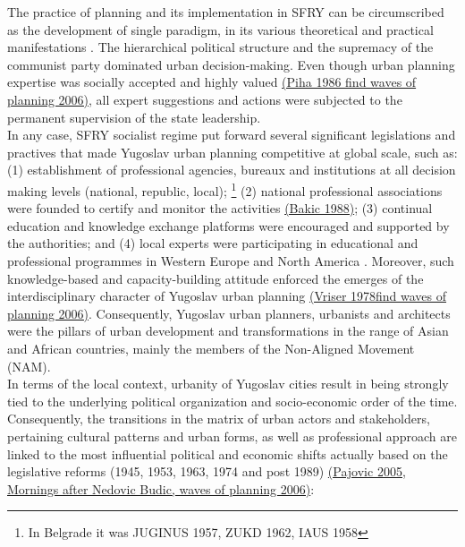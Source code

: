 \documentclass[11pt]{report}
\begin{document}
The practice of planning and its implementation in SFRY can be circumscribed as the development of single paradigm, in its various theoretical and practical manifestations \href{ref}{\citealt{vukmirovic_city_2013}}.
The hierarchical political structure and the supremacy of the communist party dominated urban decision-making.
Even though urban planning expertise was socially accepted and highly valued \href{ref}{(Piha 1986 find waves of planning 2006)}, all expert suggestions and actions were subjected to the permanent supervision of the state leadership.
\\
In any case, SFRY socialist regime put forward several significant legislations and practives that made Yugoslav urban planning competitive at global scale, such as: 
(1) establishment of professional agencies, bureaux and institutions at all decision making levels (national, republic, local);
\footnote{In Belgrade it was JUGINUS 1957, ZUKD 1962, IAUS 1958} (2) national professional associations were founded to certify and monitor the activities \href{ref}{(Bakic 1988)}; (3) continual education and knowledge exchange platforms were encouraged and supported by the authorities; and (4) local experts were participating in educational and professional programmes in Western Europe and North America \href{ref}{\citealt{nedovicbudic_waves_2006}}.
Moreover, such knowledge-based and capacity-building attitude enforced the emerges of the interdisciplinary character of Yugoslav urban planning \href{ref}{(Vriser 1978find waves of planning 2006)}.
Consequently, Yugoslav urban planners, urbanists and architects were the pillars of urban development and transformations in the range of Asian and African countries, mainly the members of the Non-Aligned Movement (NAM).
\\

In terms of the local context, urbanity of Yugoslav cities result in being strongly tied to the underlying political organization and socio-economic order of the time.
Consequently, the transitions in the matrix of urban actors and stakeholders, pertaining cultural patterns and urban forms, as well as professional approach are linked to the most influential political and economic shifts actually based on the legislative reforms (1945, 1953, 1963, 1974 and post 1989) \href{ref}{(Pajovic 2005, Mornings after Nedovic Budic, waves of planning 2006)}:
\end{document}
